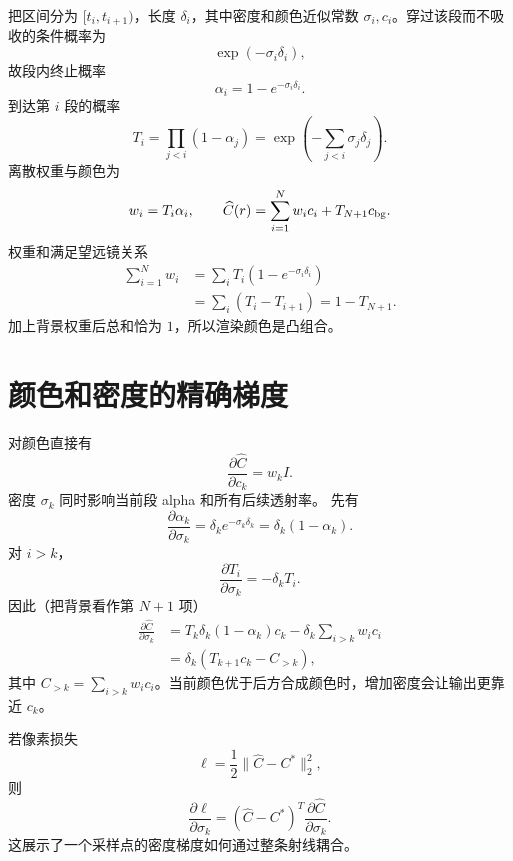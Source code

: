 \documentclass[11pt]{article}
\numberwithin{equation}{section}
\newcommand{\1}{\mathbf{1}}
\begin{document}
把区间分为 $[t_i,t_{i+1})$，长度 $\delta_i$，其中密度和颜色近似常数
$\sigma_i,c_i$。穿过该段而不吸收的条件概率为
\begin{equation}
 \exp(-\sigma_i\delta_i),
\end{equation}
故段内终止概率
\begin{equation}
 \alpha_i=1-e^{-\sigma_i\delta_i}.
\end{equation}
到达第 $i$ 段的概率
\begin{equation}
 T_i=\prod_{j<i}(1-\alpha_j)
 =\exp\left(-\sum_{j<i}\sigma_j\delta_j\right).
\end{equation}
离散权重与颜色为
\begin{equation}
 w_i=T_i\alpha_i,\qquad
 \widehat C(r)=\sum_{i=1}^{N}w_ic_i+T_{N+1}c_{\rm bg}.
\end{equation}
权重和满足望远镜关系
\begin{align}
 \sum_{i=1}^{N}w_i
 &=\sum_iT_i(1-e^{-\sigma_i\delta_i})\\
 &=\sum_i(T_i-T_{i+1})=1-T_{N+1}.
\end{align}
加上背景权重后总和恰为 $1$，所以渲染颜色是凸组合。

\section{颜色和密度的精确梯度}

对颜色直接有
\begin{equation}
 \frac{\partial\widehat C}{\partial c_k}=w_kI.
\end{equation}
密度 $\sigma_k$ 同时影响当前段 alpha 和所有后续透射率。
先有
\begin{equation}
 \frac{\partial\alpha_k}{\partial\sigma_k}
 =\delta_ke^{-\sigma_k\delta_k}=\delta_k(1-\alpha_k).
\end{equation}
对 $i>k$，
\begin{equation}
 \frac{\partial T_i}{\partial\sigma_k}=-\delta_kT_i.
\end{equation}
因此（把背景看作第 $N+1$ 项）
\begin{align}
 \frac{\partial\widehat C}{\partial\sigma_k}
 &=T_k\delta_k(1-\alpha_k)c_k
 -\delta_k\sum_{i>k}w_ic_i\\
 &=\delta_k\left(T_{k+1}c_k-C_{>k}\right),
\end{align}
其中 $C_{>k}=\sum_{i>k}w_ic_i$。当前颜色优于后方合成颜色时，增加密度会让输出更靠近 $c_k$。

若像素损失
\begin{equation}
 \ell=\frac12\|\widehat C-C^*\|_2^2,
\end{equation}
则
\begin{equation}
 \frac{\partial\ell}{\partial\sigma_k}
 =(\widehat C-C^*)^T
 \frac{\partial\widehat C}{\partial\sigma_k}.
\end{equation}
这展示了一个采样点的密度梯度如何通过整条射线耦合。
\end{document}
